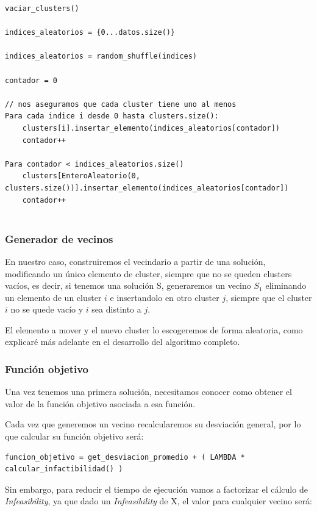 \documentclass[12pt, spanish]{article}
\begin{document}
 \begin{lstlisting}
vaciar_clusters()

indices_aleatorios = {0...datos.size()}

indices_aleatorios = random_shuffle(indices)

contador = 0

// nos aseguramos que cada cluster tiene uno al menos
Para cada indice i desde 0 hasta clusters.size():
	clusters[i].insertar_elemento(indices_aleatorios[contador])
	contador++
	
Para contador < indices_aleatorios.size()
	clusters[EnteroAleatorio(0, clusters.size())].insertar_elemento(indices_aleatorios[contador])
	contador++
	

\end{lstlisting}
 
 
\subsubsection{Generador de vecinos}

En nuestro caso, construiremos el vecindario a partir de una solución, modificando un único elemento de cluster, siempre que no se queden clusters vacíos, es decir, si tenemos una solución S, generaremos un vecino $S_1$ eliminando un elemento de un cluster $i$ e insertandolo en otro cluster $j$, siempre que el cluster $i$ no se quede vacío y $i$ sea distinto a $j$.

El elemento a mover y el nuevo cluster lo escogeremos de forma aleatoria, como explicaré más adelante en el desarrollo del algoritmo completo.

 
\subsubsection{Función objetivo} 
 
Una vez tenemos una primera solución, necesitamos conocer como obtener el valor de la función objetivo asociada a esa función.

Cada vez que generemos un vecino recalcularemos su desviación general, por lo que calcular su función objetivo será:

\begin{lstlisting}
funcion_objetivo = get_desviacion_promedio + ( LAMBDA * calcular_infactibilidad() )
 \end{lstlisting}


Sin embargo, para reducir el tiempo de ejecución vamos a factorizar el cálculo de \textit{Infeasibility}, ya que dado un \textit{Infeasibility} de X, el valor para cualquier vecino será:
\end{document}
